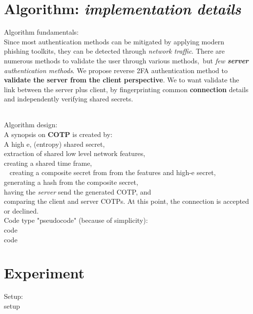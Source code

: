 \documentclass[a4paper, 11pt]{article} 				%
\begin{document}
\section{Algorithm: \textit{implementation details}}
\noindent
Algorithm fundamentals:\\
Since most authentication methods can be mitigated by applying modern phishing toolkits,
they can be detected through \textit{network traffic}.
There are numerous methods to validate the user through various methods, but \textit{few \textbf{server} authentication methods}.
We propose reverse 2FA authentication method to \textbf{validate the server from the client perspective}.
We to want validate the link between the server plus client, by fingerprinting common \textbf{connection} details and independently verifying shared secrets.\\ 

\noindent
Algorithm design:\\
A synopsis on \textbf{COTP} is created by:\\
\noindent
A high e, (entropy) shared secret,\\
extraction of shared low level network features,\\
creating a shared time frame,\\ 
creating a composite secret from from the features and high-e secret,\\
generating a hash from the composite secret,\\
having the \textit{server} send the generated COTP, and\\
comparing the client and server COTPs. At this point, the connection is accepted or declined.\\

\noindent
Code type "pseudocode" (because of simplicity):\\
code\\
code\\

\section{Experiment}				%
\noindent
Setup:\\
setup\\
\end{document}
